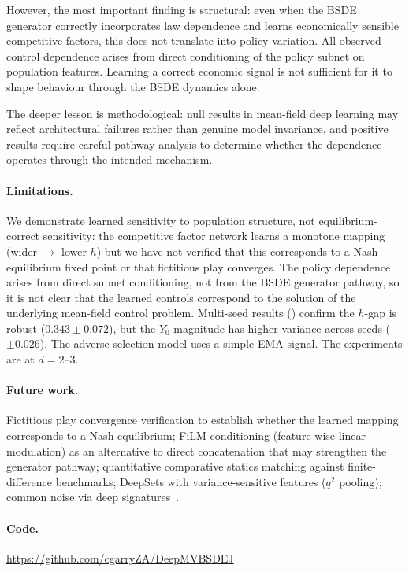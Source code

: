 \documentclass[11pt,a4paper]{article}
\begin{document}
However, the most important finding is structural: even when the BSDE generator correctly incorporates law dependence and learns economically sensible competitive factors, this does not translate into policy variation. All observed control dependence arises from direct conditioning of the policy subnet on population features. Learning a correct economic signal is not sufficient for it to shape behaviour through the BSDE dynamics alone.

The deeper lesson is methodological: null results in mean-field deep learning may reflect architectural failures rather than genuine model invariance, and positive results require careful pathway analysis to determine whether the dependence operates through the intended mechanism.

\paragraph{Limitations.} We demonstrate learned sensitivity to population structure, not equilibrium-correct sensitivity: the competitive factor network learns a monotone mapping (wider $\to$ lower $h$) but we have not verified that this corresponds to a Nash equilibrium fixed point or that fictitious play converges. The policy dependence arises from direct subnet conditioning, not from the BSDE generator pathway, so it is not clear that the learned controls correspond to the solution of the underlying mean-field control problem. Multi-seed results () confirm the $h$-gap is robust ($0.343 \pm 0.072$), but the $Y_0$ magnitude has higher variance across seeds ($\pm 0.026$). The adverse selection model uses a simple EMA signal. The experiments are at $d = 2$--$3$.

\paragraph{Future work.} Fictitious play convergence verification to establish whether the learned mapping corresponds to a Nash equilibrium; FiLM conditioning (feature-wise linear modulation) as an alternative to direct concatenation that may strengthen the generator pathway; quantitative comparative statics matching against finite-difference benchmarks; DeepSets with variance-sensitive features ($q^2$ pooling); common noise via deep signatures~\cite{hu2025deep}.

\paragraph{Code.} \url{https://github.com/cgarryZA/DeepMVBSDEJ}
\end{document}
